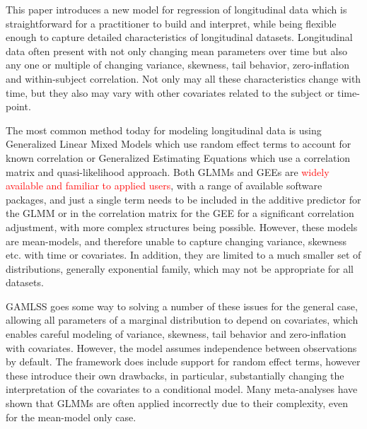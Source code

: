 \documentclass{article}
\newcommand{\jsschange}[1]{\textcolor{red}{#1}}
\begin{document}
This paper introduces a new model for regression of longitudinal data which is straightforward for a practitioner to build and interpret, while being flexible enough to capture detailed characteristics of longitudinal datasets. Longitudinal data often present with not only changing mean parameters over time but also any one or multiple of changing variance, skewness, tail behavior, zero-inflation and within-subject correlation. Not only may all these characteristics change with time, but they also may vary with other covariates related to the subject or time-point.

The most common method today for modeling longitudinal data is using Generalized Linear Mixed Models which use random effect terms to account for known correlation or Generalized Estimating Equations\citep{Liang1986} which use a correlation matrix and quasi-likelihood approach. Both GLMMs and GEEs are \jsschange{widely available and familiar to applied users}, with a range of available software packages, and just a single term needs to be included in the additive predictor for the GLMM or in the correlation matrix for the GEE for a significant correlation adjustment, with more complex structures being possible. However, these models are mean-models, and therefore unable to capture changing variance, skewness etc. with time or covariates. In addition, they are limited to a much smaller set of distributions, generally exponential family, which may not be appropriate for all datasets.

GAMLSS goes some way to solving a number of these issues for the general case, allowing all parameters of a marginal distribution to depend on covariates, which enables careful modeling of variance, skewness, tail behavior and zero-inflation with covariates. However, the model assumes independence between observations by default. The framework does include support for random effect terms, however these introduce their own drawbacks, in particular, substantially changing the interpretation of the covariates to a conditional model. Many meta-analyses have shown that GLMMs are often applied incorrectly due to their complexity, even for the mean-model only case. 
\end{document}
